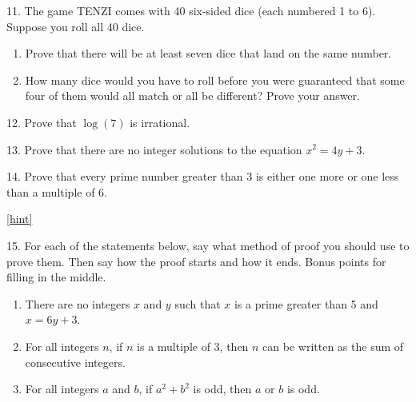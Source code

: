 \documentclass[10pt,]{book}
\theoremstyle{plain}
\theoremstyle{definition}
\theoremstyle{definition}
\theoremstyle{definition}
\numberwithin{equation}{chapter}
\begin{document}
\begin{exerciselist}
\par\smallskip
\item[11.]\hypertarget{exercise-125}{}\hypertarget{p-2547}{}%
The game TENZI comes with 40 six-sided dice (each numbered 1 to 6). Suppose you roll all 40 dice. \leavevmode%
\begin{enumerate}[label=(\alph*)]
\item\hypertarget{li-545}{}Prove that there will be at least seven dice that land on the same number.%
\item\hypertarget{li-546}{}\hypertarget{p-2548}{}%
How many dice would you have to roll before you were guaranteed that some four of them would all match or all be different? Prove your answer.%
\end{enumerate}
%
\par\smallskip
\item[12.]\hypertarget{exercise-126}{}\hypertarget{p-2554}{}%
Prove that \(\log(7)\) is irrational.%
\par\smallskip
\item[13.]\hypertarget{exercise-127}{}\hypertarget{p-2559}{}%
Prove that there are no integer solutions to the equation \(x^2 = 4y + 3\).%
\par\smallskip
\item[14.]\hypertarget{exercise-128}{}\hypertarget{p-2560}{}%
Prove that every prime number greater than 3 is either one more or one less than a multiple of 6.%
\par\smallskip
\hfill{\tiny\hyperlink{a-B.5.14}{[hint]}\hypertarget{q-B.5.14}{}}\item[15.]\hypertarget{exercise-129}{}\hypertarget{p-2562}{}%
For each of the statements below, say what method of proof you should use to prove them. Then say how the proof starts and how it ends. Bonus points for filling in the middle.%
\par
\hypertarget{p-2563}{}%
\leavevmode%
\begin{enumerate}[label=(\alph*)]
\item\hypertarget{li-549}{}\hypertarget{p-2564}{}%
There are no integers \(x\) and \(y\) such that \(x\) is a prime greater than 5 and \(x = 6y + 3\).%
\item\hypertarget{li-550}{}\hypertarget{p-2565}{}%
For all integers \(n\), if \(n\) is a multiple of 3, then \(n\) can be written as the sum of consecutive integers.%
\item\hypertarget{li-551}{}\hypertarget{p-2566}{}%
For all integers \(a\) and \(b\), if \(a^2 + b^2\) is odd, then \(a\) or \(b\) is odd.%
\end{enumerate}

\end{exerciselist}
\end{document}
